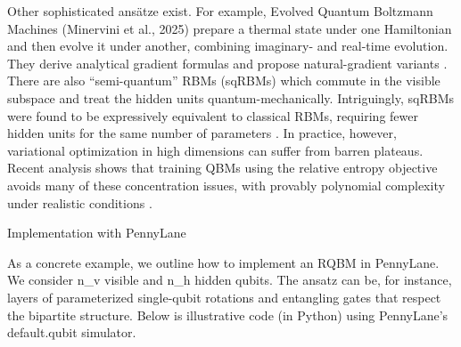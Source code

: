 Other sophisticated ansätze exist.  For example, Evolved Quantum Boltzmann Machines (Minervini et al., 2025) prepare a thermal state under one Hamiltonian and then evolve it under another, combining imaginary- and real-time evolution.  They derive analytical gradient formulas and propose natural-gradient variants .  There are also “semi-quantum” RBMs (sqRBMs) which commute in the visible subspace and treat the hidden units quantum-mechanically.  Intriguingly, sqRBMs were found to be expressively equivalent to classical RBMs, requiring fewer hidden units for the same number of parameters . In practice, however, variational optimization in high dimensions can suffer from barren plateaus. Recent analysis shows that training QBMs using the relative entropy objective avoids many of these concentration issues, with provably polynomial complexity under realistic conditions .





Implementation with PennyLane





As a concrete example, we outline how to implement an RQBM in PennyLane. We consider n_v visible and n_h hidden qubits. The ansatz can be, for instance, layers of parameterized single-qubit rotations and entangling gates that respect the bipartite structure.  Below is illustrative code (in Python) using PennyLane’s default.qubit simulator.



